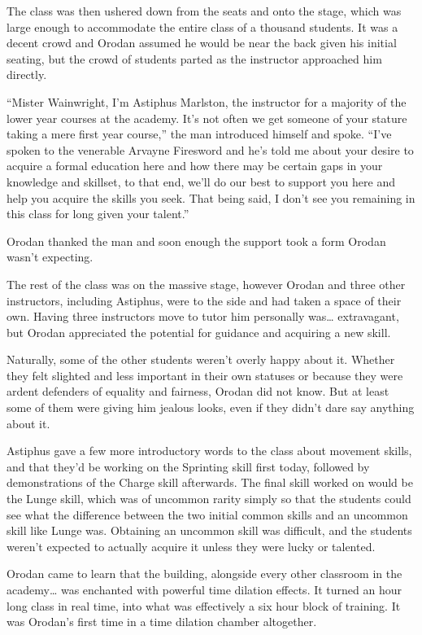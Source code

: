 \documentclass[a4paper,10pt]{book}
\begin{document}
The class was then ushered down from the seats and onto the stage, which was large enough to accommodate the entire class of a thousand students. It was a decent crowd and Orodan assumed he would be near the back given his initial seating, but the crowd of students parted as the instructor approached him directly.\par
“Mister Wainwright, I’m Astiphus Marlston, the instructor for a majority of the lower year courses at the academy. It’s not often we get someone of your stature taking a mere first year course,” the man introduced himself and spoke. “I’ve spoken to the venerable Arvayne Firesword and he’s told me about your desire to acquire a formal education here and how there may be certain gaps in your knowledge and skillset, to that end, we’ll do our best to support you here and help you acquire the skills you seek. That being said, I don’t see you remaining in this class for long given your talent.”\par
Orodan thanked the man and soon enough the support took a form Orodan wasn’t expecting.\par
The rest of the class was on the massive stage, however Orodan and three other instructors, including Astiphus, were to the side and had taken a space of their own. Having three instructors move to tutor him personally was… extravagant, but Orodan appreciated the potential for guidance and acquiring a new skill.\par
Naturally, some of the other students weren’t overly happy about it. Whether they felt slighted and less important in their own statuses or because they were ardent defenders of equality and fairness, Orodan did not know. But at least some of them were giving him jealous looks, even if they didn’t dare say anything about it.\par
Astiphus gave a few more introductory words to the class about movement skills, and that they’d be working on the Sprinting skill first today, followed by demonstrations of the Charge skill afterwards. The final skill worked on would be the Lunge skill, which was of uncommon rarity simply so that the students could see what the difference between the two initial common skills and an uncommon skill like Lunge was. Obtaining an uncommon skill was difficult, and the students weren't expected to actually acquire it unless they were lucky or talented.\par
Orodan came to learn that the building, alongside every other classroom in the academy… was enchanted with powerful time dilation effects. It turned an hour long class in real time, into what was effectively a six hour block of training. It was Orodan’s first time in a time dilation chamber altogether.\par
\end{document}
